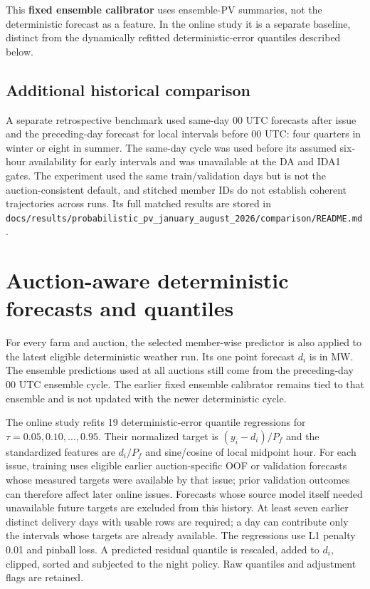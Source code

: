 \documentclass[11pt,a4paper]{article}
\newcommand{\code}[1]{\nolinkurl{#1}}
\begin{document}
This \textbf{fixed ensemble calibrator} uses ensemble-PV summaries, not the deterministic forecast as a feature. In the online study it is a separate baseline, distinct from the dynamically refitted deterministic-error quantiles described below.

\subsection{Additional historical comparison}
A separate retrospective benchmark used same-day 00 UTC forecasts after issue and the preceding-day forecast for local intervals before 00 UTC: four quarters in winter or eight in summer. The same-day cycle was used before its assumed six-hour availability for early intervals and was unavailable at the DA and IDA1 gates. The experiment used the same train/validation days but is not the auction-consistent default, and stitched member IDs do not establish coherent trajectories across runs. Its full matched results are stored in \code{docs/results/probabilistic_pv_january_august_2026/comparison/README.md}.

\section{Auction-aware deterministic forecasts and quantiles}
For every farm and auction, the selected member-wise predictor is also applied to the latest eligible deterministic weather run. Its one point forecast $d_i$ is in MW. The ensemble predictions used at all auctions still come from the preceding-day 00 UTC ensemble cycle. The earlier fixed ensemble calibrator remains tied to that ensemble and is not updated with the newer deterministic cycle.

The online study refits 19 deterministic-error quantile regressions for $\tau=0.05,0.10,\ldots,0.95$. Their normalized target is $(y_i-d_i)/P_f$ and the standardized features are $d_i/P_f$ and sine/cosine of local midpoint hour. For each issue, training uses eligible earlier auction-specific OOF or validation forecasts whose measured targets were available by that issue; prior validation outcomes can therefore affect later online issues. Forecasts whose source model itself needed unavailable future targets are excluded from this history. At least seven earlier distinct delivery days with usable rows are required; a day can contribute only the intervals whose targets are already available. The regressions use L1 penalty 0.01 and pinball loss. A predicted residual quantile is rescaled, added to $d_i$, clipped, sorted and subjected to the night policy. Raw quantiles and adjustment flags are retained.
\end{document}
